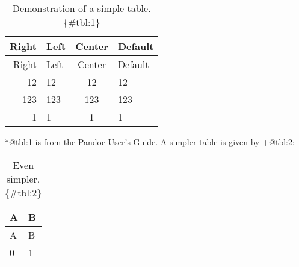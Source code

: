 \begin{longtable}[]{@{}rlcl@{}}
\caption{Demonstration of a simple table. \{\#tbl:1\}}\tabularnewline
\toprule
Right & Left & Center & Default\tabularnewline
\midrule
\endfirsthead
\toprule
Right & Left & Center & Default\tabularnewline
\midrule
\endhead
12 & 12 & 12 & 12\tabularnewline
123 & 123 & 123 & 123\tabularnewline
1 & 1 & 1 & 1\tabularnewline
\bottomrule
\end{longtable}

*@tbl:1 is from the Pandoc User's Guide. A simpler table is given by
+@tbl:2:

\begin{longtable}[]{@{}ll@{}}
\caption{Even simpler. \{\#tbl:2\}}\tabularnewline
\toprule
A & B\tabularnewline
\midrule
\endfirsthead
\toprule
A & B\tabularnewline
\midrule
\endhead
0 & 1\tabularnewline
\bottomrule
\end{longtable}
